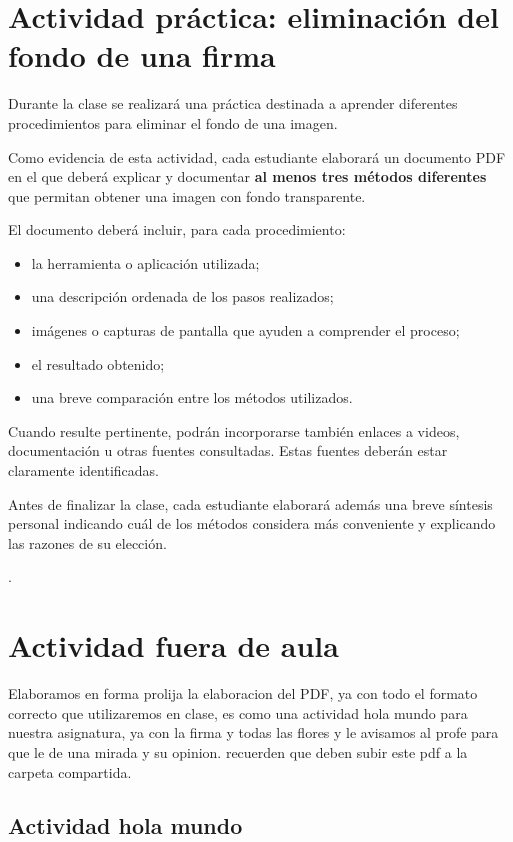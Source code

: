 \documentclass[10pt]{article}
\begin{document}
\section{Actividad práctica: eliminación del fondo de una firma}

Durante la clase se realizará una práctica destinada a aprender diferentes
procedimientos para eliminar el fondo de una imagen.

Como evidencia de esta actividad, cada estudiante elaborará un documento
PDF en el que deberá explicar y documentar \textbf{al menos tres métodos
diferentes} que permitan obtener una imagen con fondo transparente.

El documento deberá incluir, para cada procedimiento:

\begin{itemize}
    \item la herramienta o aplicación utilizada;
    \item una descripción ordenada de los pasos realizados;
    \item imágenes o capturas de pantalla que ayuden a comprender el proceso;
    \item el resultado obtenido;
    \item una breve comparación entre los métodos utilizados.
\end{itemize}

Cuando resulte pertinente, podrán incorporarse también enlaces a videos,
documentación u otras fuentes consultadas. Estas fuentes deberán estar
claramente identificadas.

Antes de finalizar la clase, cada estudiante elaborará además una breve
síntesis personal indicando cuál de los métodos considera más conveniente
y explicando las razones de su elección.

. 

\section{Actividad fuera de aula}

Elaboramos en forma prolija la elaboracion del PDF, ya con todo el formato correcto que utilizaremos en clase, es como una actividad hola mundo para nuestra asignatura, ya con la firma y todas las flores y le avisamos al profe para que le de una mirada y su opinion. recuerden que deben subir este pdf a la carpeta compartida. 

\subsection{Actividad hola mundo}
\end{document}
